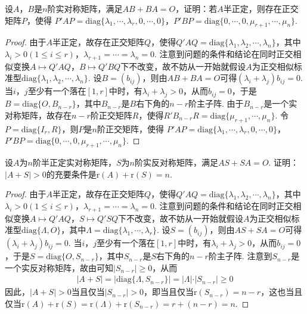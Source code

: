 \documentclass[../../main.tex]{subfiles}%
\begin{document}
\begin{proposition}\label{proposition:例9.70}
设\(A\)，\(B\)是\(n\)阶实对称矩阵，满足\(AB + BA = O\)，证明：若\(A\)半正定，则存在正交矩阵\(P\)，使得
\(P'AP=\mathrm{diag}\{\lambda_1,\cdots,\lambda_r,0,\cdots,0\}\)，\(P'BP=\mathrm{diag}\{0,\cdots,0,\mu_{r + 1},\cdots,\mu_n\}\).
\end{proposition}
\begin{proof}
由于\(A\)半正定，故存在正交矩阵\(Q\)，使得\(Q'AQ=\mathrm{diag}\{\lambda_1,\lambda_2,\cdots,\lambda_n\}\)，其中\(\lambda_i>0(1\leqslant  i\leqslant  r)\)，\(\lambda_{r + 1}=\cdots=\lambda_n = 0\). 注意到问题的条件和结论在同时正交相似变换\(A\mapsto Q'AQ\)，\(B\mapsto Q'BQ\)下不改变，故不妨从一开始就假设\(A\)为正交相似标准型\(\mathrm{diag}\{\lambda_1,\lambda_2,\cdots,\lambda_n\}\). 设\(B=(b_{ij})\)，则由\(AB + BA = O\)可得\((\lambda_i + \lambda_j)b_{ij}=0\). 当\(i\)，\(j\)至少有一个落在\([1,r]\)中时，有\(\lambda_i + \lambda_j>0\)，从而\(b_{ij}=0\)，于是\(B=\mathrm{diag}\{O,B_{n - r}\}\)，其中\(B_{n - r}\)是\(B\)右下角的\(n - r\)阶主子阵. 由于\(B_{n - r}\)是一个实对称矩阵，故存在\(n - r\)阶正交矩阵\(R\)，使得\(R'B_{n - r}R=\mathrm{diag}\{\mu_{r + 1},\cdots,\mu_n\}\). 令\(P=\mathrm{diag}\{I_r,R\}\)，则\(P\)是\(n\)阶正交矩阵，使得
\(P'AP=\mathrm{diag}\{\lambda_1,\cdots,\lambda_r,0,\cdots,0\}\)，\(P'BP=\mathrm{diag}\{0,\cdots,0,\mu_{r + 1},\cdots,\mu_n\}\).
\end{proof}

\begin{proposition}\label{proposition:例9.71}
设\(A\)为\(n\)阶半正定实对称矩阵，\(S\)为\(n\)阶实反对称矩阵，满足\(AS + SA = O\). 证明：\(\vert A + S\vert>0\)的充要条件是\(\mathrm{r}(A)+\mathrm{r}(S)=n\).
\end{proposition}
\begin{proof}
由于\(A\)半正定，故存在正交矩阵\(Q\)，使得\(Q'AQ=\mathrm{diag}\{\lambda_1,\lambda_2,\cdots,\lambda_n\}\)，其中\(\lambda_i>0(1\leqslant  i\leqslant  r)\)，\(\lambda_{r + 1}=\cdots=\lambda_n = 0\). 注意到问题的条件和结论在同时正交相似变换\(A\mapsto Q'AQ\)，\(S\mapsto Q'SQ\)下不改变，故不妨从一开始就假设\(A\)为正交相似标准型\(\mathrm{diag}\{\Lambda,O\}\)，其中\(\Lambda=\mathrm{diag}\{\lambda_1,\cdots,\lambda_r\}\). 设\(S=(b_{ij})\)，则由\(AS + SA = O\)可得\((\lambda_i + \lambda_j)b_{ij}=0\). 当\(i\)，\(j\)至少有一个落在\([1,r]\)中时，有\(\lambda_i + \lambda_j>0\)，从而\(b_{ij}=0\)，于是\(S=\mathrm{diag}\{O,S_{n - r}\}\)，其中\(S_{n - r}\)是\(S\)右下角的\(n - r\)阶主子阵. 注意到\(S_{n - r}\)是一个实反对称矩阵，故由可知\(\vert S_{n - r}\vert\geqslant 0\)，从而
\begin{align*}
\vert A + S\vert=\vert\mathrm{diag}\{\Lambda,S_{n - r}\}\vert=\vert\Lambda\vert\cdot\vert S_{n - r}\vert\geqslant 0
\end{align*}
因此，\(\vert A + S\vert>0\)当且仅当\(\vert S_{n - r}\vert>0\)，即当且仅当\(\mathrm{r}(S_{n - r})=n - r\)，这也当且仅当\(\mathrm{r}(A)+\mathrm{r}(S)=\mathrm{r}(\Lambda)+\mathrm{r}(S_{n - r})=r+(n - r)=n\).
\end{proof}
\end{document}
